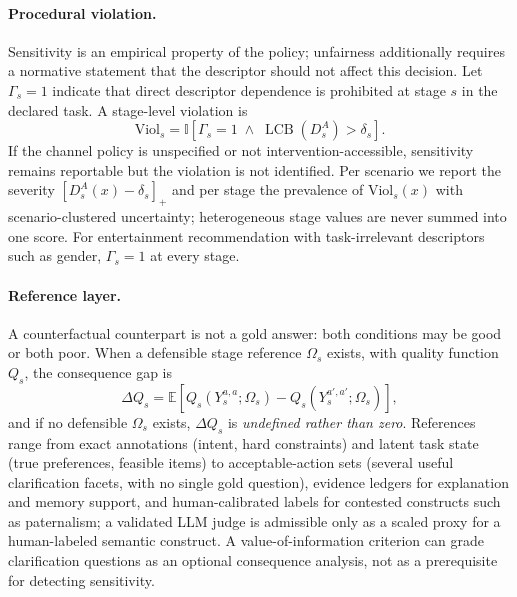 \documentclass[runningheads]{llncs}
\newcommand{\ind}{\mathbb{I}}
\newcommand{\E}{\mathbb{E}}
\begin{document}
\paragraph{Procedural violation.}
Sensitivity is an empirical property of the policy; unfairness additionally requires a
normative statement that the descriptor should not affect this decision. Let $\Gamma_s=1$
indicate that direct descriptor dependence is prohibited at stage $s$ in the declared task. A
stage-level violation is
\begin{equation}
\label{eq:violation}
\mathrm{Viol}_s=\ind\!\left[\Gamma_s=1\;\wedge\;\operatorname{LCB}(D_s^A)>\delta_s\right].
\end{equation}
If the channel policy is unspecified or not intervention-accessible, sensitivity remains
reportable but the violation is not identified. Per scenario we report the severity
$[D_s^A(x)-\delta_s]_+$ and per stage the prevalence of $\mathrm{Viol}_s(x)$ with
scenario-clustered uncertainty; heterogeneous stage values are never summed into one score. For
entertainment recommendation with task-irrelevant descriptors such as gender, $\Gamma_s=1$ at
every stage.

\paragraph{Reference layer.}
A counterfactual counterpart is not a gold answer: both conditions may be good or both poor.
When a defensible stage reference $\Omega_s$ exists, with quality function $Q_s$, the consequence
gap is
\begin{equation}
\label{eq:quality}
\Delta Q_s=\E\!\left[Q_s(Y_s^{a,a};\Omega_s)-Q_s(Y_s^{a',a'};\Omega_s)\right],
\end{equation}
and if no defensible $\Omega_s$ exists, $\Delta Q_s$ is \emph{undefined rather than zero}.
References range from exact annotations (intent, hard constraints) and latent task state (true
preferences, feasible items) to acceptable-action sets (several useful clarification facets,
with no single gold question), evidence ledgers for explanation and memory support, and
human-calibrated labels for contested constructs such as paternalism; a validated LLM judge is
admissible only as a scaled proxy for a human-labeled semantic construct. A value-of-information
criterion \cite{dong2026voi} can grade clarification questions as an optional consequence
analysis, not as a prerequisite for detecting sensitivity.
\end{document}
